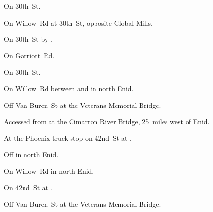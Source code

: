 
\begin{LocationList}

On  30th~St.

On  Willow~Rd at 30th~St, opposite Global Mills.

On  30th~St by .

On  Garriott~Rd.

On  30th~St.

On Willow~Rd between  and   in north Enid.

Off   Van Buren~St at the Veterans Memorial Bridge.

Accessed from    at the Cimarron River Bridge, 25~miles west of Enid.

At the Phoenix truck stop on 42nd~St at .

\Location{\RecruitmentAgency \Recruitment}
Off  in north Enid.

On  Willow~Rd in north Enid.

\Location{\TruckStop \Gas \Rest \Service \Weigh}
On 42nd~St at .

Off   Van Buren~St at the Veterans Memorial Bridge.

\end{LocationList}
